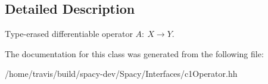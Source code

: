 \subsection{Detailed Description}
Type-\/erased differentiable operator $A:\ X \to Y $. 

The documentation for this class was generated from the following file\-:\begin{DoxyCompactItemize}
\item 
/home/travis/build/spacy-\/dev/\-Spacy/\-Interfaces/c1\-Operator.\-hh\end{DoxyCompactItemize}
